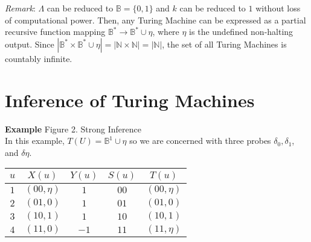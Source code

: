 \documentclass[11pt]{article}
\newcommand{\N}{\mathbb{N}}
\newcommand{\B}{\mathbb{B}}
\begin{document}
\bigbreak

\textit{Remark}: $\Lambda$ can be reduced to $ \B = \{0, 1\} $ and $ k $ can be reduced to $ 1 $ without loss of computational power. Then, any Turing Machine can be expressed as a partial recursive function mapping $ \B^{*} \rightarrow \B^{*} \cup \eta $, where $ \eta $ is the undefined non-halting output. Since $ |\B^{*} \times \B^{*} \cup \eta | = | \N \times \N | = | \N | $, the set of all Turing Machines is countably infinite. 

\pagebreak


\section{Inference of Turing Machines} 

\textbf{Example} \quad Figure 2. Strong Inference \\

 In this example, $T(U) = \B^{1} \cup \eta $ so we are concerned with three probes $ \delta_{0}, \delta_{1}$, and $ \delta{\eta} $. 

 \begin{center}
 \begin{tabular}{ c||c|c|c|c } 

 $ u $ & $ X(u) $ & $ Y(u) $ & $ S(u) $ & $ T(u) $ \\ 
 \hline
 \hline
 $ 1 $ & $ (00, \eta) $ & $ 1 $ & $ 00 $ & $ (00, \eta) $ \\
 \hline
 $ 2 $ & $ (01, 0) $ & $ 1 $ & $ 01 $ & $ (01, 0) $ \\
 \hline
 $ 3 $ & $ (10, 1) $ & $ 1 $ & $ 10 $ & $ (10, 1) $ \\
 \hline
 $ 4 $ & $ (11, 0) $ & $ -1 $ & $ 11 $ & $ (11, \eta) $ \\
 
 \end{tabular}
 \end{center} 
 
\end{document}
